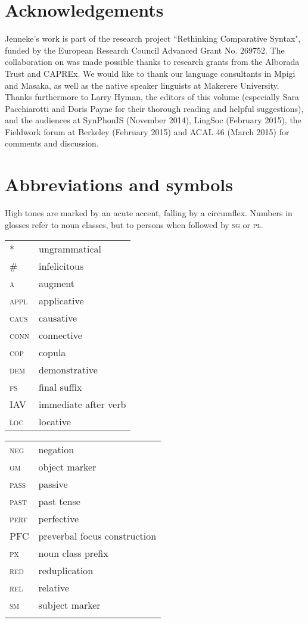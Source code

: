\documentclass[output=paper]{langsci/langscibook}
\begin{document}
\section*{Acknowledgements}

Jenneke’s work is part of the research project ``Rethinking Comparative Syntax", funded by the European Research Council Advanced Grant No. 269752. The collaboration on  was made possible thanks to research grants from the Alborada Trust and CAPREx. We would like to thank our language consultants in Mpigi and Masaka, as well as the native speaker linguists at Makerere University. Thanks furthermore to Larry Hyman, the editors of this volume (especially Sara Pacchiarotti and Doris Payne for their thorough reading and helpful suggestions), and the audiences at  SynPhonIS (November 2014), LingSoc (February 2015), the Fieldwork forum at Berkeley (February 2015) and ACAL 46 (March 2015) for comments and discussion.

\section*{Abbreviations and symbols}

High tones are marked by an acute accent, falling by a circumflex. Numbers in glosses refer to noun classes, but to persons when followed by \textsc{sg} or \textsc{pl}.
\medskip 

\begin{tabularx}{.45\textwidth}{lX}
* & ungrammatical\\
\# & infelicitous \\
\textsc{a} & augment \\
\textsc{appl} & applicative \\
\textsc{caus} & causative \\
\textsc{conn} & connective \\ 
\textsc{cop} & copula \\
\textsc{dem} & demonstrative \\
\textsc{fs} & final suffix \\
IAV & immediate after verb \\
\textsc{loc} & locative \\
\end{tabularx} 
\begin{tabularx}{.45\textwidth}{lX}
\textsc{neg} & negation \\
\textsc{om} & object marker \\
\textsc{pass} & passive \\
\textsc{past} & past tense \\
\textsc{perf} & perfective \\
PFC & preverbal focus construction \\
\textsc{px} & noun class prefix \\ 
\textsc{red} & reduplication \\
\textsc{rel} & relative \\
\textsc{sm} & subject marker \\
\\
\end{tabularx}
  
{\sloppy
\printbibliography[heading=subbibliography,notkeyword=this]
}
\end{document}
